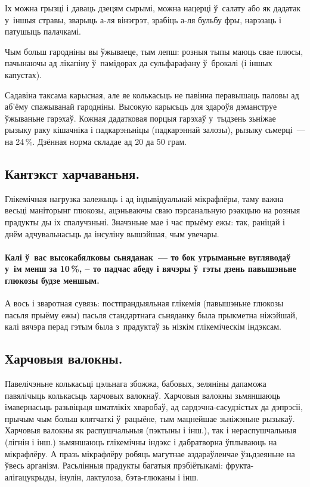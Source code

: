Іх можна грызці і даваць дзецям сырымі, можна нацерці ў~салату або як дадатак у~іншыя стравы, зварыць а-ля вінэгрэт, зрабіць а-ля бульбу фры, нарэзаць і патушыць палачкамі. 

Чым больш гародніны вы ўжываеце, тым лепш: розныя тыпы маюць свае плюсы, пачынаючы ад лікапіну ў~памідорах да сульфарафану ў~брокалі (і іншых капустах).

Садавіна таксама карысная, але яе колькасьць не павінна перавышаць паловы ад аб'ёму спажыванай гародніны. Высокую карысьць для здароўя дэманструе ўжываньне гарэхаў. Кожная дадатковая порцыя гарэхаў у~тыдзень зьніжае рызыку раку кішачніка і падкарэньніцы (падкарэннай залозы), рызыку сьмерці~--- на 24\,\%. Дзённая норма складае ад 20 да 50 грам.

\subsection*{Кантэкст харчаваньня.}
Глікемічная нагрузка залежыць і ад індывідуальнай мікрафлёры, таму важна весьці маніторынг глюкозы, ацэньваючы сваю пэрсанальную рэакцыю на розныя прадукты ды іх спалучэньні. Значэньне мае і час прыёму ежы: так, раніцай і днём адчувальнасьць да інсуліну вышэйшая, чым увечары. 

\paragraph{Калі ў~вас высокабялковы сьняданак~--- то бок утрыманьне вугляводаў у~ім менш за 10\,\%, -- то падчас абеду і вячэры ў~гэты дзень павышэньне глюкозы будзе меншым.} А вось і зваротная сувязь: постпрандыяльная глікемія (павышэньне глюкозы пасьля прыёму ежы) пасьля стандартнага сьняданку была прыкметна ніжэйшай, калі вячэра перад гэтым была з~прадуктаў зь нізкім глікеміческім індэксам.

\subsection*{Харчовыя валокны.}
Павелічэньне колькасьці цэльнага збожжа, бабовых, зеляніны дапаможа павялічыць колькасьць харчовых валокнаў. Харчовыя валокны зьмяншаюць імавернасьць разьвіцьця шматлікіх хваробаў, ад сардэчна-сасудзістых да дэпрэсіі, прычым чым больш клятчаткі ў~рацыёне, тым мацнейшае зьніжэньне рызыкаў. Харчовыя валокны як распушчальныя (пэктыны і інш.), так і нераспушчальныя (лігнін і інш.) зьмяншаюць глікемічны індэкс і дабратворна ўплываюць на мікрафлёру. А празь мікрафлёру робяць магутнае аздараўленчае ўзьдзеяньне на ўвесь арганізм. Расьлінныя прадукты багатыя прэбіётыкамі: фрукта-алігацукрыды, інулін, лактулоза, бэта-глюканы і інш.

